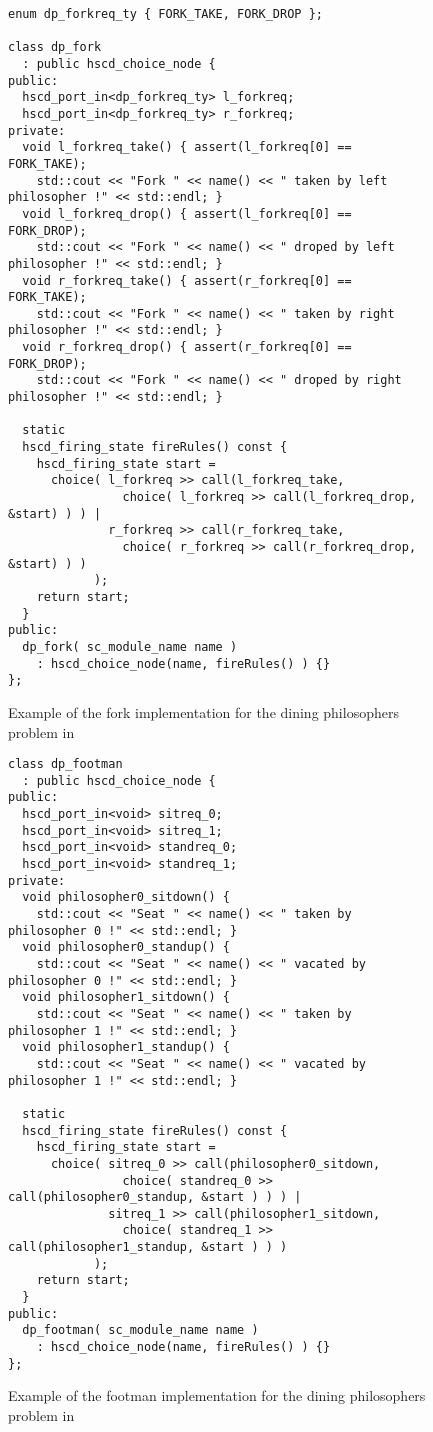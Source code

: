 \begin{figure}
\centering
\begin{verbatim}
enum dp_forkreq_ty { FORK_TAKE, FORK_DROP };

class dp_fork
  : public hscd_choice_node {
public:
  hscd_port_in<dp_forkreq_ty> l_forkreq;
  hscd_port_in<dp_forkreq_ty> r_forkreq;
private:
  void l_forkreq_take() { assert(l_forkreq[0] == FORK_TAKE);
    std::cout << "Fork " << name() << " taken by left philosopher !" << std::endl; }
  void l_forkreq_drop() { assert(l_forkreq[0] == FORK_DROP);
    std::cout << "Fork " << name() << " droped by left philosopher !" << std::endl; }
  void r_forkreq_take() { assert(r_forkreq[0] == FORK_TAKE);
    std::cout << "Fork " << name() << " taken by right philosopher !" << std::endl; }
  void r_forkreq_drop() { assert(r_forkreq[0] == FORK_DROP);
    std::cout << "Fork " << name() << " droped by right philosopher !" << std::endl; }
  
  static
  hscd_firing_state fireRules() const {
    hscd_firing_state start =
      choice( l_forkreq >> call(l_forkreq_take,
                choice( l_forkreq >> call(l_forkreq_drop, &start) ) ) |
              r_forkreq >> call(r_forkreq_take,
                choice( r_forkreq >> call(r_forkreq_drop, &start) ) )
            );
    return start;
  }
public:
  dp_fork( sc_module_name name )
    : hscd_choice_node(name, fireRules() ) {}
};
\end{verbatim}
\caption{\label{dining-philosophers-fork-systemoc}
  Example of the fork implementation for the
  dining philosophers problem in \SysteMoC{}}
\end{figure}


\begin{figure}
\centering
\begin{verbatim}
class dp_footman
  : public hscd_choice_node {
public:
  hscd_port_in<void> sitreq_0;
  hscd_port_in<void> sitreq_1;
  hscd_port_in<void> standreq_0;
  hscd_port_in<void> standreq_1;
private:
  void philosopher0_sitdown() {
    std::cout << "Seat " << name() << " taken by philosopher 0 !" << std::endl; }
  void philosopher0_standup() {
    std::cout << "Seat " << name() << " vacated by philosopher 0 !" << std::endl; }
  void philosopher1_sitdown() {
    std::cout << "Seat " << name() << " taken by philosopher 1 !" << std::endl; }
  void philosopher1_standup() {
    std::cout << "Seat " << name() << " vacated by philosopher 1 !" << std::endl; }
  
  static
  hscd_firing_state fireRules() const {
    hscd_firing_state start =
      choice( sitreq_0 >> call(philosopher0_sitdown,
                choice( standreq_0 >> call(philosopher0_standup, &start ) ) ) |
              sitreq_1 >> call(philosopher1_sitdown,
                choice( standreq_1 >> call(philosopher1_standup, &start ) ) )
            );
    return start;
  }
public:
  dp_footman( sc_module_name name )
    : hscd_choice_node(name, fireRules() ) {}
};
\end{verbatim}
\caption{\label{dining-philosophers-csp-systemoc}
  Example of the footman implementation for the
  dining philosophers problem in \SysteMoC{}}
\end{figure}


